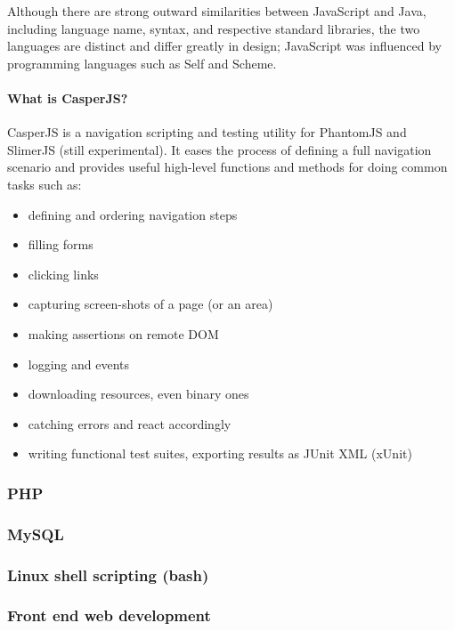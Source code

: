 \documentclass{article}
\begin{document}
	Although there are strong outward similarities between JavaScript and Java, including language name, syntax, and respective standard libraries, the two languages are distinct and differ greatly in design; JavaScript was influenced by programming languages such as Self and Scheme.
	
	\paragraph{What is CasperJS?}
	CasperJS is a navigation scripting and testing utility for PhantomJS and SlimerJS (still experimental). It eases the process of defining a full navigation scenario and provides useful high-level functions and methods for doing common tasks such as:
	\begin{itemize}
		\item defining and ordering navigation steps
		\item filling forms
		\item clicking links
		\item capturing screen-shots of a page (or an area)
		\item making assertions on remote DOM		
		\item logging and events
		\item downloading resources, even binary ones
		\item catching errors and react accordingly
		\item writing functional test suites, exporting results as JUnit XML (xUnit)
	\end{itemize}
	\begin{center}
		
	\end{center}
	
	\subsubsection{PHP}
	\subsubsection{MySQL}
	\subsubsection{Linux shell scripting (bash)}
	\subsubsection{Front end web development}
	
	
\end{document}
